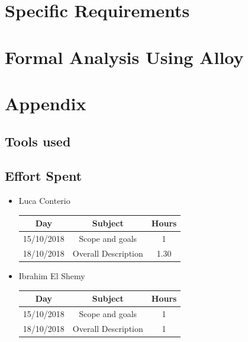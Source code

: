 \documentclass[12pt,a4paper]{article}
\begin{document}
	\newpage
	\section{Specific Requirements}
	
	\newpage
	\section{Formal Analysis Using Alloy}

	\newpage
	\section{Appendix}
	\subsection{Tools used}
	
	\subsection{Effort Spent}
		\begin{itemize}
			\item Luca Conterio
			\begin{center}
				\begin{tabular}{| c | c | c |}
					\hline
					Day & Subject & Hours \\ \hline
					15/10/2018 & Scope and goals & 1 \\
					18/10/2018 & Overall Description & 1.30 \\
					\hline
				\end{tabular}
			\end{center}
		
			\item Ibrahim El Shemy
			\begin{center}
				\begin{tabular}{| c | c | c |}
					\hline
					Day & Subject & Hours \\ \hline
					15/10/2018 & Scope and goals & 1 \\
					18/10/2018 & Overall Description & 1 \\
					\hline
				\end{tabular}
			\end{center}
		\end{itemize}
	
\end{document}
